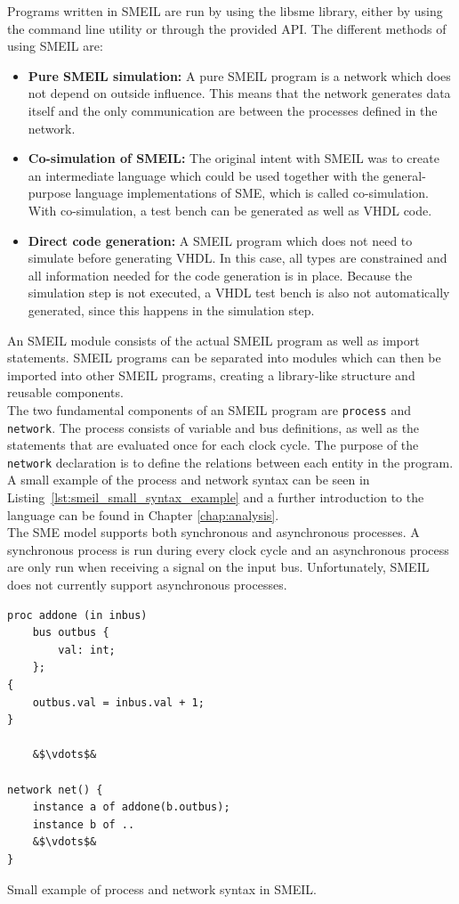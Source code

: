 Programs written in SMEIL are run by using the libsme library, either by using the command line utility or through the provided API.
The different methods of using SMEIL are:\\
\begin{itemize}
    \item \textbf{Pure SMEIL simulation:} A pure SMEIL program is a network which does not depend on outside influence. This means that the network generates data itself and the only communication are between the processes defined in the network.
    \item \textbf{Co-simulation of SMEIL:} The original intent with SMEIL was to create an intermediate language which could be used together with the general-purpose language implementations of SME, which is called co-simulation. With co-simulation, a test bench can be generated as well as VHDL code.
    \item \textbf{Direct code generation:} A SMEIL program which does not need to simulate before generating VHDL. In this case, all types are constrained and all information needed for the code generation is in place. Because the simulation step is not executed, a VHDL test bench is also not automatically generated, since this happens in the simulation step.
\end{itemize}
An SMEIL module consists of the actual SMEIL program as well as import statements. SMEIL programs can be separated into modules which can then be imported into other SMEIL programs, creating a library-like structure and reusable components.\\

The two fundamental components of an SMEIL program are \texttt{process} and \texttt{network}. The process consists of variable and bus definitions, as well as the statements that are evaluated once for each clock cycle. The purpose of the \texttt{network} declaration is to define the relations between each entity in the program. A small example of the process and network syntax can be seen in Listing~\ref{lst:smeil_small_syntax_example} and a further introduction to the language can be found in Chapter \ref{chap:analysis}.\\

The SME model supports both synchronous and asynchronous processes. A synchronous process is run during every clock cycle and an asynchronous process are only run when receiving a signal on the input bus. Unfortunately, SMEIL does not currently support asynchronous processes.
\begin{listing}
\begin{verbatim}
proc addone (in inbus)
    bus outbus {
        val: int;
    };
{
    outbus.val = inbus.val + 1;
}

    &$\vdots$&

network net() {
    instance a of addone(b.outbus);
    instance b of ..
    &$\vdots$&
}
\end{verbatim}
\caption{Small example of process and network syntax in SMEIL.}
\label{lst:smeil_small_syntax_example}
\end{listing}
